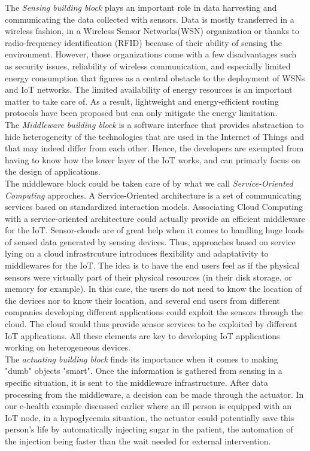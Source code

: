 The \textit{Sensing building block} plays an important role in data harvesting and communicating the data collected with sensors. Data is mostly transferred in a wireless fashion, in a Wireless Sensor Networks(WSN) organization or thanks to radio-frequency identification (RFID) because of their ability of sensing the environment. However, those organizations come with a few disadvantages such as security issues, reliability of wireless communication, and especially limited energy consumption that figures as a central obstacle to the deployment of WSNs and IoT networks. The limited availability of energy resources is an important matter to take care of. As a result, lightweight and energy-efficient routing protocols have been proposed but can only mitigate the energy limitation. \\

The \textit{Middleware building block} is a software interface that provides abstraction to hide heterogeneity of the technologies that are used in the Internet of Things and that may indeed differ from each other. Hence, the developers are exempted from having to know how the lower layer of the IoT works, and can primarly focus on the design of applications. \\

The middleware block could be taken care of by what we call \textit{Service-Oriented Computing} approches. A Service-Oriented architecture is a set of communicating services based on standardized interaction models. Associating Cloud Computing with a service-oriented architecture could actually provide an efficient middleware for the IoT. Sensor-clouds are of great help when it comes to handling huge loads of sensed data generated by sensing devices. Thus, approaches based on service lying on a cloud infrastrcuture introduces flexibility and adaptativity to middlewares for the IoT. The idea is to have the end users feel as if the physical sensors were virtually part of their physical resources (in their disk storage, or memory for example). In this case, the users do not need to know the location of the devices nor to know their location, and several end users from different companies developing different applications could exploit the sensors through the cloud. The cloud would thus provide sensor services to be exploited by different IoT applications. All these elements are key to developing IoT applications working on heterogeneous devices. \\

The \textit{actuating building block} finds its importance when it comes to making "dumb" objects "smart". Once the information is gathered from sensing in a specific situation, it is sent to the middleware infrastructure. After data processing from the middleware, a decision can be made through the actuator. In our e-health example discussed earlier where an ill person is equipped with an IoT node, in a hypoglycemia situation, the actuator could potentially save this person's life by automatically injecting sugar in the patient, the automation of the injection being faster than the wait needed for external intervention. \\

